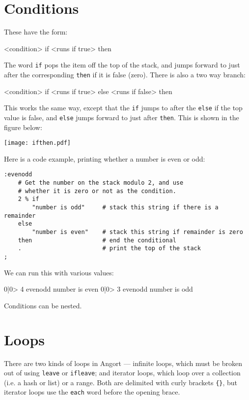 \section{Conditions}
These have the form:
\begin{v}
<condition> if <runs if true> then
\end{v}
The word \texttt{if} pops the item off the top of the stack,
and jumps forward to just after the corresponding \texttt{then} if it is false (zero).
There is also a two way branch:
\begin{v}
<condition> if <runs if true> else <runs if false> then
\end{v}
This works the same way, except that the \texttt{if} jumps to after the
\texttt{else} if the top value is false, and \texttt{else} jumps forward
to just after \texttt{then}. This is shown in the figure below:
\begin{center}
\texttt{[image: ifthen.pdf]}
\end{center}
Here is a code example, printing whether a number is even or odd:
\begin{lstlisting}
:evenodd 
    # Get the number on the stack modulo 2, and use
    # whether it is zero or not as the condition.
    2 % if
        "number is odd"     # stack this string if there is a remainder
    else
        "number is even"    # stack this string if remainder is zero
    then                    # end the conditional
    .                       # print the top of the stack
;
\end{lstlisting}
We can run this with various values:
\begin{v}
0|0> 4 evenodd
number is even
0|0> 3 evenodd
number is odd
\end{v}
Conditions can be nested.


\section{Loops}
There are two kinds of loops in Angort --- infinite loops,
which must be broken out of using \texttt{leave} or \texttt{ifleave}; and
iterator loops, which loop over a collection (i.e. a hash or list) or
a range. Both are delimited with curly brackets \verb+{}+, but iterator loops
use the \texttt{each} word before the opening brace.

